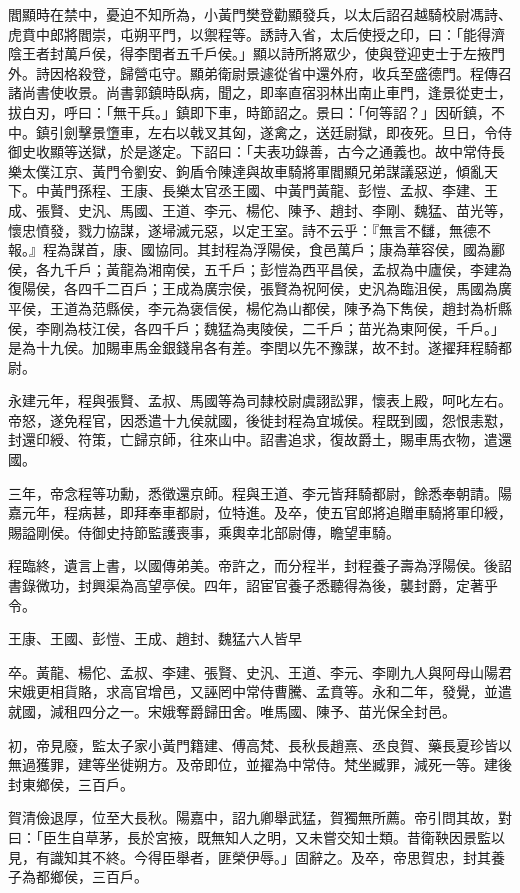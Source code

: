 \begin{pinyinscope}
閻顯時在禁中，憂迫不知所為，小黃門樊登勸顯發兵，以太后詔召越騎校尉馮詩、虎賁中郎將閻崇，屯朔平門，以禦程等。誘詩入省，太后使授之印，曰：「能得濟陰王者封萬戶侯，得李閏者五千戶侯。」顯以詩所將眾少，使與登迎吏士于左掖門外。詩因格殺登，歸營屯守。顯弟衛尉景遽從省中還外府，收兵至盛德門。程傳召諸尚書使收景。尚書郭鎮時臥病，聞之，即率直宿羽林出南止車門，逢景從吏士，拔白刃，呼曰：「無干兵。」鎮即下車，時節詔之。景曰：「何等詔？」因斫鎮，不中。鎮引劍擊景墯車，左右以戟叉其匈，遂禽之，送廷尉獄，即夜死。旦日，令侍御史收顯等送獄，於是遂定。下詔曰：「夫表功錄善，古今之通義也。故中常侍長樂太僕江京、黃門令劉安、鉤盾令陳達與故車騎將軍閻顯兄弟謀議惡逆，傾亂天下。中黃門孫程、王康、長樂太官丞王國、中黃門黃龍、彭愷、孟叔、李建、王成、張賢、史汎、馬國、王道、李元、楊佗、陳予、趙封、李剛、魏猛、苗光等，懷忠憤發，戮力協謀，遂埽滅元惡，以定王室。詩不云乎：『無言不讎，無德不報。』程為謀首，康、國協同。其封程為浮陽侯，食邑萬戶；康為華容侯，國為酈侯，各九千戶；黃龍為湘南侯，五千戶；彭愷為西平昌侯，孟叔為中廬侯，李建為復陽侯，各四千二百戶；王成為廣宗侯，張賢為祝阿侯，史汎為臨沮侯，馬國為廣平侯，王道為范縣侯，李元為褒信侯，楊佗為山都侯，陳予為下雋侯，趙封為析縣侯，李剛為枝江侯，各四千戶；魏猛為夷陵侯，二千戶；苗光為東阿侯，千戶。」是為十九侯。加賜車馬金銀錢帛各有差。李閏以先不豫謀，故不封。遂擢拜程騎都尉。

永建元年，程與張賢、孟叔、馬國等為司隸校尉虞詡訟罪，懷表上殿，呵叱左右。帝怒，遂免程官，因悉遣十九侯就國，後徙封程為宜城侯。程既到國，怨恨恚懟，封還印綬、符策，亡歸京師，往來山中。詔書追求，復故爵土，賜車馬衣物，遣還國。

三年，帝念程等功勳，悉徵還京師。程與王道、李元皆拜騎都尉，餘悉奉朝請。陽嘉元年，程病甚，即拜奉車都尉，位特進。及卒，使五官郎將追贈車騎將軍印綬，賜謚剛侯。侍御史持節監護喪事，乘輿幸北部尉傳，瞻望車騎。

程臨終，遺言上書，以國傳弟美。帝許之，而分程半，封程養子壽為浮陽侯。後詔書錄微功，封興渠為高望亭侯。四年，詔宦官養子悉聽得為後，襲封爵，定著乎令。

王康、王國、彭愷、王成、趙封、魏猛六人皆早

卒。黃龍、楊佗、孟叔、李建、張賢、史汎、王道、李元、李剛九人與阿母山陽君宋娥更相貨賂，求高官增邑，又誣罔中常侍曹騰、孟賁等。永和二年，發覺，並遣就國，減租四分之一。宋娥奪爵歸田舍。唯馬國、陳予、苗光保全封邑。

初，帝見廢，監太子家小黃門籍建、傅高梵、長秋長趙熹、丞良賀、藥長夏珍皆以無過獲罪，建等坐徙朔方。及帝即位，並擢為中常侍。梵坐臧罪，減死一等。建後封東鄉侯，三百戶。

賀清儉退厚，位至大長秋。陽嘉中，詔九卿舉武猛，賀獨無所薦。帝引問其故，對曰：「臣生自草茅，長於宮掖，既無知人之明，又未嘗交知士類。昔衛鞅因景監以見，有識知其不終。今得臣舉者，匪榮伊辱。」固辭之。及卒，帝思賀忠，封其養子為都鄉侯，三百戶。


\end{pinyinscope}
